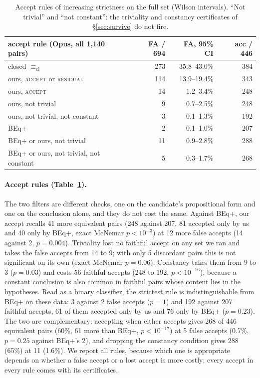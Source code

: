 \documentclass[10pt]{article}
\theoremstyle{definition}
\newcommand{\Ecl}{\mathrel{\equiv_{\mathrm{cl}}}}
\newcommand{\V}[1]{\textsc{#1}}
\begin{document}
\begin{table}[t]
\centering\small
\begin{tabular}{lrrr}
\toprule
accept rule (Opus, all 1,140 pairs) & FA / 694 & FA, 95\% CI & acc / 446\\
\midrule
closed $\Ecl$ & 273 & 35.8--43.0\% & 384\\
ours, \V{accept} or \V{residual} & 114 & 13.9--19.4\% & 343\\
ours, \V{accept} & 14 & 1.2--3.4\% & 248\\
ours, not trivial & 9 & 0.7--2.5\% & 248\\
ours, not trivial, not constant & 3 & 0.1--1.3\% & 192\\
BEq+ & 2 & 0.1--1.0\% & 207\\
BEq+ or ours, not trivial & 11 & 0.9--2.8\% & 288\\
BEq+ or ours, not trivial, not constant & 5 & 0.3--1.7\% & 268\\
\bottomrule
\end{tabular}
\caption{Accept rules of increasing strictness on the full set (Wilson intervals). ``Not trivial''
and ``not constant'': the triviality and constancy certificates of \S\ref{sec:survive} do not
fire.}
\label{tab:levels}
\end{table}

\paragraph{Accept rules (Table~\ref{tab:levels}).} The two filters are different checks, one on the
candidate's propositional form and one on the conclusion alone, and they do not cost the same.
Against BEq+, our accept recalls 41 more equivalent pairs (248 against 207, 81 accepted only by
us and 40 only by BEq+, exact McNemar $p<10^{-3}$) at 12 more false accepts (14 against 2,
$p=0.004$). Triviality lost no faithful accept on any set we ran and takes the false accepts from
14 to 9; with only 5 discordant pairs this is not significant on its own (exact McNemar $p=0.06$).
Constancy takes them from 9 to 3 ($p=0.03$) and costs 56 faithful accepts (248 to 192,
$p<10^{-16}$), because a constant conclusion is also common in faithful pairs whose content lies
in the hypotheses. Read as a binary classifier, the strictest rule is indistinguishable from BEq+
on these data: 3 against 2 false accepts ($p=1$) and 192 against 207 faithful accepts, 61 of them
accepted only by us and 76 only by BEq+ ($p=0.23$). The two are complementary: accepting when
either accepts gives 268 of 446 equivalent pairs (60\%, 61 more than BEq+, $p<10^{-17}$) at 5
false accepts (0.7\%, $p=0.25$ against BEq+'s 2), and dropping the constancy condition gives 288
(65\%) at 11 (1.6\%). We report all rules, because which one is appropriate depends on whether a false accept or
a lost accept is more costly; every accept in every rule comes with its certificates.
\end{document}
